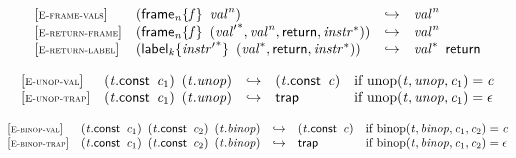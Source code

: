 $$
\begin{array}{@{}l@{}lcl@{}l@{}}
{[\textsc{\scriptsize E{-}frame{-}vals}]} \quad & ({{\mathsf{frame}}_{{\mathit{n}}}}{\{{\mathit{f}}\}}~\,{{\mathit{val}}^{{\mathit{n}}}}) &\hookrightarrow& {{\mathit{val}}^{{\mathit{n}}}} &  \\
{[\textsc{\scriptsize E{-}return{-}frame}]} \quad & ({{\mathsf{frame}}_{{\mathit{n}}}}{\{{\mathit{f}}\}}~\,({{\mathit{val}'}^\ast}, {{\mathit{val}}^{{\mathit{n}}}}, \mathsf{return}, {{\mathit{instr}}^\ast})) &\hookrightarrow& {{\mathit{val}}^{{\mathit{n}}}} &  \\
{[\textsc{\scriptsize E{-}return{-}label}]} \quad & ({{\mathsf{label}}_{{\mathit{k}}}}{\{{{\mathit{instr}'}^\ast}\}}~\,({{\mathit{val}}^\ast}, \mathsf{return}, {{\mathit{instr}}^\ast})) &\hookrightarrow& {{\mathit{val}}^\ast}~\,\mathsf{return} &  \\
\end{array}
$$

\vspace{1ex}

$$
\begin{array}{@{}l@{}lcl@{}l@{}}
{[\textsc{\scriptsize E{-}unop{-}val}]} \quad & ({\mathit{t}}.\mathsf{const}~\,{\mathit{c}}_{{1}})~\,({\mathit{t}} . {\mathit{unop}}) &\hookrightarrow& ({\mathit{t}}.\mathsf{const}~\,{\mathit{c}}) &\quad
  \mbox{if}~{\mathrm{unop}}({\mathit{t}}, {\mathit{unop}}, {\mathit{c}}_{{1}}) = {\mathit{c}} \\
{[\textsc{\scriptsize E{-}unop{-}trap}]} \quad & ({\mathit{t}}.\mathsf{const}~\,{\mathit{c}}_{{1}})~\,({\mathit{t}} . {\mathit{unop}}) &\hookrightarrow& \mathsf{trap} &\quad
  \mbox{if}~{\mathrm{unop}}({\mathit{t}}, {\mathit{unop}}, {\mathit{c}}_{{1}}) = \epsilon \\
\end{array}
$$

\vspace{1ex}

$$
\begin{array}{@{}l@{}lcl@{}l@{}}
{[\textsc{\scriptsize E{-}binop{-}val}]} \quad & ({\mathit{t}}.\mathsf{const}~\,{\mathit{c}}_{{1}})~\,({\mathit{t}}.\mathsf{const}~\,{\mathit{c}}_{{2}})~\,({\mathit{t}} . {\mathit{binop}}) &\hookrightarrow& ({\mathit{t}}.\mathsf{const}~\,{\mathit{c}}) &\quad
  \mbox{if}~{\mathrm{binop}}({\mathit{t}}, {\mathit{binop}}, {\mathit{c}}_{{1}}, {\mathit{c}}_{{2}}) = {\mathit{c}} \\
{[\textsc{\scriptsize E{-}binop{-}trap}]} \quad & ({\mathit{t}}.\mathsf{const}~\,{\mathit{c}}_{{1}})~\,({\mathit{t}}.\mathsf{const}~\,{\mathit{c}}_{{2}})~\,({\mathit{t}} . {\mathit{binop}}) &\hookrightarrow& \mathsf{trap} &\quad
  \mbox{if}~{\mathrm{binop}}({\mathit{t}}, {\mathit{binop}}, {\mathit{c}}_{{1}}, {\mathit{c}}_{{2}}) = \epsilon \\
\end{array}
$$

